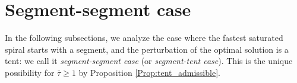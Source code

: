 \documentclass[reqno]{amsart}
\theoremstyle{definition} \newtheorem{definition}{Definition}[section]
\theoremstyle{definition} \newtheorem{remark}[definition]{Remark}
\theoremstyle{plain} \newtheorem{lemma}[definition]{Lemma}
\theoremstyle{plain} \newtheorem{proposition}[definition]{Proposition}
\theoremstyle{plain} \newtheorem{theorem}[definition]{Theorem}
\theoremstyle{plain} \newtheorem{corollary}[definition]{Corollary}
\theoremstyle{definition} \newtheorem{example}[definition]{Example}
\theoremstyle{plain} \newtheorem{claim}[clai]{Claim}
\theoremstyle{definition} \newtheorem{assumption}[definition]{Assumption}
\theoremstyle{definition} \newtheorem{observation}[definition]{Observation}
\newcommand{\1}{\mathbbm 1}
\numberwithin{equation}{section} %
\theoremstyle{plain} \newtheorem*{theorem*}{Theorem}
\theoremstyle{plain} \newtheorem{mthm}[maintheorem]{Main Theorem}
\theoremstyle{plain} \newtheorem*{mthm*}{Main Theorem}
\theoremstyle{plain} \newtheorem*{conjecture*}{Conjecture}
\theoremstyle{plain} \newtheorem{conjecture}[definition]{Conjecture}
\theoremstyle{plain} \newtheorem*{problem*}{Problem}
\begin{document}
%
%
%
%
%
%
%
%
%
%
%
%
%
%


\section{Segment-segment case}
\label{S:segment_case}


In the following subsections, we analyze the case where the fastest saturated spiral starts with a segment, and the perturbation of the optimal solution is a tent: we call it \emph{segment-segment case} (or \emph{segment-tent case}). This is the unique possibility for $\bar \tau \geq 1$ by Proposition \ref{Prop:tent_admissible}.
\end{document}
